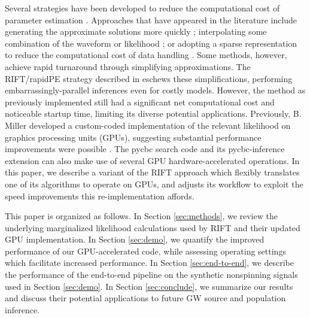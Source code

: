 \documentclass[twocolumn,prd,nofootinbib]{revtex4}
\newcommand\AddedResponse[1]{{\color{blue} {#1}}}
\begin{document}
Several strategies have been
developed to reduce the 
computational cost of parameter estimation \cite{gwastro-pe-Brandon-STF2,gwastro-PE-AlternativeArchitectures,gw-astro-ReducedOrderQuadraturePE-TiglioEtAl2014,2016PhRvD..94d4031S,2017CQGra..34k5006V,2018arXiv180608792Z}.  
Approaches that have appeared in the literature include
generating the approximate solutions more quickly \cite{gwastro-mergers-PE-ReducedOrder-2013,2014PhRvX...4c1006F,2013PhRvD..87l2002S,2013PhRvD..87d4008C,gwastro-mergers-IMRPhenomP,gwastro-SpinTaylorF2-2013}; 
interpolating some combination
of the waveform or likelihood \cite{gwastro-approx-ROMNR-Blackman2015,2013PhRvD..87d4008C,2013PhRvD..87l2002S,2014CQGra..31s5010P,2014PhRvD..90d4074S,gwastro-PE-AlternativeArchitectures,cole2014likelihood,2012MNRAS.421..169G};  or 
adopting a sparse representation to reduce the computational cost of data
handling \cite{antil2013two,gwastro-mergers-PE-ReducedOrder-2013,2016PhRvD..94d4031S,gw-astro-ReducedOrderQuadraturePE-TiglioEtAl2014,gwastro-PE-AlternativeArchitectures,2010arXiv1007.4820C,2018arXiv180608792Z}.   %
 Some methods, however, achieve rapid turnaround through simplifying approximations.  
%
The RIFT/rapidPE strategy described in \cite{gwastro-PE-AlternativeArchitectures,2017CQGra..34n4002O,gwastro-PENR-RIFT,NRPaper} eschews these simplifications, performing
embarrassingly-parallel inferences even for costly models.   However, the method as previously implemented still had a
significant net  computational cost and noticeable startup time, limiting its diverse potential applications.
%
Previously, B. Miller  developed a custom-coded  implementation of the
relevant likelihood on graphics processing units (GPUs), suggesting substantial performance improvements were possible
\cite{Thesis-Brandon-2016,GPU-NU-work}.  
\AddedResponse{The pycbc search code\cite{2016CQGra..33u5004U} and its pycbc-inference extension
  \cite{2019PASP..131b4503B} can also make use of several GPU
  hardware-accelerated operations.
}
In this paper,  we describe a variant of the RIFT approach which flexibly translates one of its
algorithms to operate on GPUs, and adjusts its workflow to exploit the speed improvements
this re-implementation affords.


This paper is organized as follows.
In Section \ref{sec:methods}, we review the underlying marginalized likelihood calculations used by RIFT and  their updated GPU
implementation.  
In Section \ref{sec:demo}, we quantify the improved performance of our  GPU-accelerated code,   while assessing
operating settings which facilitate increased performance.
In Section \ref{sec:end-to-end}, we describe the performance of the end-to-end pipeline on the synthetic nonspinning signals used in
Section \ref{sec:demo}.  
In Section \ref{sec:conclude}, we summarize our results and discuss their potential applications to future GW source and
population inference.
\end{document}
